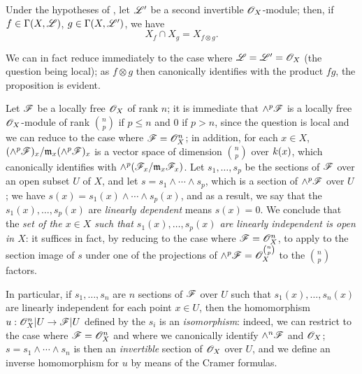 \begin{env}[5.5.3]
\label{0.5.5.3}
Under the hypotheses of , let $\mathscr{L}'$ be a second invertible $\mathscr{O}_X$-module;
then, if $f\in\Gamma(X,\mathscr{L})$, $g\in\Gamma(X,\mathscr{L}')$, we have
\[
  X_f\cap X_g=X_{f\otimes g}.
\]

We can in fact reduce immediately to the case where $\mathscr{L}=\mathscr{L}'=\mathscr{O}_X$ (the question being local);
as $f\otimes g$ then canonically identifies with the product $fg$, the proposition is evident.
\end{env}

\begin{env}[5.5.4]
\label{0.5.5.4}
Let $\mathscr{F}$ be a locally free $\mathscr{O}_X$ of rank $n$;
it is immediate that $\wedge^p\mathscr{F}$ is a locally free $\mathscr{O}_X$-module of rank $\binom{n}{p}$ if $p\leq n$ and $0$ if $p>n$, since the question is local and we can reduce to the case where $\mathscr{F}=\mathscr{O}_X^n$;
in addition, for each $x\in X$, $(\wedge^p\mathscr{F})_x/\mathfrak{m}_x(\wedge^p\mathscr{F})_x$ is a vector space of dimension $\binom{n}{p}$ over $k(x)$, which canonically identifies with $\wedge^p(\mathscr{F}_x/\mathfrak{m}_x\mathscr{F}_x)$.
Let $s_1,\dots,s_p$ be the sections of $\mathscr{F}$ over an open subset $U$ of $X$, and let $s=s_1\wedge\cdots\wedge s_p$, which is a section of $\wedge^p\mathscr{F}$ over $U$ ;
we have $s(x)=s_1(x)\wedge\cdots\wedge s_p(x)$, and as a result, we say that the $s_1(x),\dots,s_p(x)$ are \emph{linearly dependent} means $s(x)=0$.
We conclude that the \emph{set of the $x\in X$ such that $s_1(x),\dots,s_p(x)$ are linearly independent is open in $X$}: it suffices in fact, by reducing to the case where $\mathscr{F}=\mathscr{O}_X^n$, to apply  to the section image of $s$ under one of the projections of $\wedge^p\mathscr{F}=\mathscr{O}_X^{\binom{n}{p}}$ to the $\binom{n}{p}$ factors.

In particular, if $s_1,\dots,s_n$ are $n$ sections of $\mathscr{F}$ over $U$ such that $s_1(x),\dots,s_n(x)$ are linearly independent for each point $x\in U$, then the homomorphism $u:\OO_X^n|U\to\sh{F}|U$ defined by the $s_i$  is an \emph{isomorphism}:
indeed, we can restrict to the case where $\mathscr{F}=\mathscr{O}_X^n$ and where we canonically identify $\wedge^n\mathscr{F}$ and $\mathscr{O}_X$;
$s=s_1\wedge\cdots\wedge s_n$ is then an \emph{invertible} section of $\mathscr{O}_X$ over $U$, and we define an inverse homomorphism for $u$ by means of the Cramer formulas.
\end{env}

